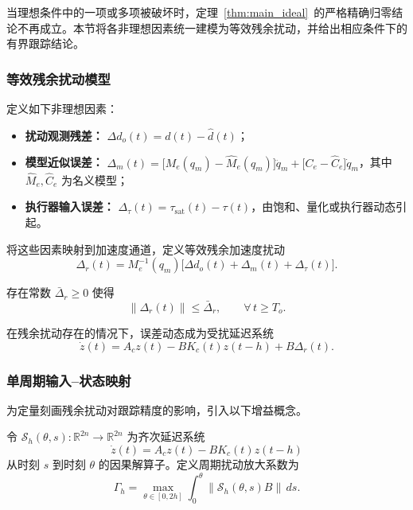 当理想条件中的一项或多项被破坏时，定理~\ref{thm:main_ideal}~的严格精确归零结论不再成立。本节将各非理想因素统一建模为等效残余扰动，并给出相应条件下的有界跟踪结论。

\subsubsection{等效残余扰动模型}

定义如下非理想因素：
\begin{itemize}
  \item \textbf{扰动观测残差：} \(\Delta d_o(t) = d(t) - \hat d(t)\)；
  \item \textbf{模型近似误差：} \(\Delta_m(t) = \bigl[M_e(q_m)-\hat M_e(q_m)\bigr]\ddot q_m + \bigl[C_e-\hat C_e\bigr]\dot q_m\)，其中 \(\hat M_e,\hat C_e\) 为名义模型；
  \item \textbf{执行器输入误差：} \(\Delta_\tau(t) = \tau_{\mathrm{sat}}(t) - \tau(t)\)，由饱和、量化或执行器动态引起。
\end{itemize}

将这些因素映射到加速度通道，定义等效残余加速度扰动
\begin{equation}
\Delta_r(t) = M_e^{-1}(q_m)\bigl[\Delta d_o(t) + \Delta_m(t) + \Delta_\tau(t)\bigr].
\label{eq:residual_acceleration}
\end{equation}

\begin{assumption}[残余扰动有界]\label{as:residual_bounded}
  存在常数 \(\bar\Delta_r\ge 0\) 使得
  \begin{equation}
  \|\Delta_r(t)\| \le \bar\Delta_r,\qquad \forall\,t\ge T_o.
  \label{eq:residual_bound}
  \end{equation}
\end{assumption}

在残余扰动存在的情况下，误差动态成为受扰延迟系统
\begin{equation}
\dot z(t) = A_c z(t) - BK_c(t)z(t-h) + B\Delta_r(t).
\label{eq:perturbed_delay_error}
\end{equation}

\subsubsection{单周期输入--状态映射}

为定量刻画残余扰动对跟踪精度的影响，引入以下增益概念。

\begin{definition}\label{def:pdf_gain}
  令 \(\mathcal S_h(\theta,s):\mathbb R^{2n}\to\mathbb R^{2n}\) 为齐次延迟系统
  \[
  \dot z(t) = A_c z(t) - BK_c(t)z(t-h)
  \]
  从时刻 \(s\) 到时刻 \(\theta\) 的因果解算子。定义周期扰动放大系数为
  \begin{equation}
  \Gamma_h = \max_{\theta\in[0,2h]} \int_0^\theta \bigl\|\mathcal S_h(\theta,s)B\bigr\|\,ds.
  \label{eq:pdf_disturbance_gain}
  \end{equation}
\end{definition}

